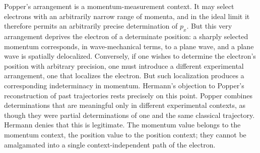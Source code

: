 Popper’s arrangement is a momentum-measurement context. It may select electrons with an arbitrarily narrow range of momenta, and in the ideal limit it therefore permits an arbitrarily precise determination of $p_x$. But this very arrangement deprives the electron of a determinate position: a sharply selected momentum corresponds, in wave-mechanical terms, to a plane wave, and a plane wave is spatially delocalized. Conversely, if one wishes to determine the electron’s position with arbitrary precision, one must introduce a different experimental arrangement, one that localizes the electron. But such localization produces a corresponding indeterminacy in momentum. Hermann’s objection to Popper’s reconstruction of past trajectories rests precisely on this point. Popper combines determinations that are meaningful only in different experimental contexts, as though they were partial determinations of one and the same classical trajectory. Hermann denies that this is legitimate. The momentum value belongs to the momentum context, the position value to the position context; they cannot be amalgamated into a single context-independent path of the electron.





